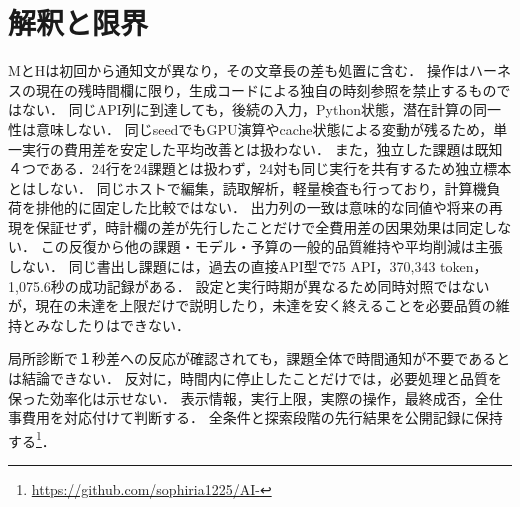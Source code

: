 \documentclass[uplatex,a4paper,twocolumn,10pt]{jsarticle}
\begin{document}
\section{解釈と限界}
MとHは初回から通知文が異なり，その文章長の差も処置に含む．
操作はハーネスの現在の残時間欄に限り，生成コードによる独自の時刻参照を禁止するものではない．
同じAPI列に到達しても，後続の入力，Python状態，潜在計算の同一性は意味しない．
同じseedでもGPU演算やcache状態による変動が残るため，単一実行の費用差を安定した平均改善とは扱わない．
また，独立した課題は既知４つである．24行を24課題とは扱わず，24対も同じ実行を共有するため独立標本とはしない．
同じホストで編集，読取解析，軽量検査も行っており，計算機負荷を排他的に固定した比較ではない．
出力列の一致は意味的な同値や将来の再現を保証せず，時計欄の差が先行したことだけで全費用差の因果効果は同定しない．
この反復から他の課題・モデル・予算の一般的品質維持や平均削減は主張しない．
同じ書出し課題には，過去の直接API型で75 API，370,343 token，1,075.6秒の成功記録がある．
設定と実行時期が異なるため同時対照ではないが，現在の未達を上限だけで説明したり，未達を安く終えることを必要品質の維持とみなしたりはできない．

局所診断で１秒差への反応が確認されても，課題全体で時間通知が不要であるとは結論できない．
反対に，時間内に停止したことだけでは，必要処理と品質を保った効率化は示せない．
表示情報，実行上限，実際の操作，最終成否，全仕事費用を対応付けて判断する．
全条件と探索段階の先行結果を公開記録に保持する\footnote{\url{https://github.com/sophiria1225/AI-}}．
\end{document}
